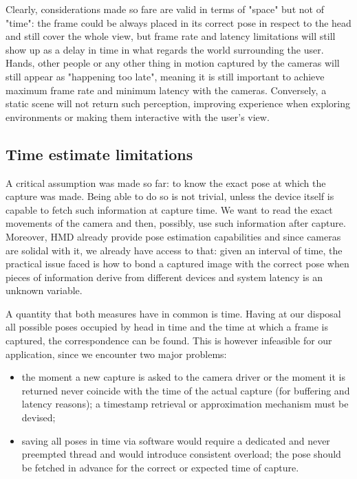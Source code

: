 Clearly, considerations made so fare are valid in terms of "space" but not of "time": the frame could be always placed in its correct pose in respect to the head and still cover the whole view, but frame rate and latency limitations will still show up as a delay in time in what regards the world surrounding the user. Hands, other people or any other thing in motion captured by the cameras will still appear as "happening too late", meaning it is still important to achieve maximum frame rate and minimum latency with the cameras. Conversely, a static scene will not return such perception, improving experience when exploring environments or making them interactive with the user's view.

\subsection{Time estimate limitations}
A critical assumption was made so far: to know the exact pose at which the capture was made. Being able to do so is not trivial, unless the device itself is capable to fetch such information at capture time. We want to read the exact movements of the camera and then, possibly, use such information after capture. Moreover, HMD already provide pose estimation capabilities and since cameras are solidal with it, we already have access to that: given an interval of time, the practical issue faced is how to bond a captured image with the correct pose when pieces of information derive from different devices and system latency is an unknown variable.

A quantity that both measures have in common is time. Having at our disposal all possible poses occupied by head in time and the time at which a frame is captured, the correspondence can be found. This is however infeasible for our application, since we encounter two major problems:
\begin{itemize}
\item the moment a new capture is asked to the camera driver or the moment it is returned never coincide with the time of the actual capture (for buffering and latency reasons); a timestamp retrieval or approximation mechanism must be devised;
\item saving all poses in time via software would require a dedicated and never preempted thread and would introduce consistent overload; the pose should be fetched in advance for the correct or expected time of capture.
\end{itemize}


